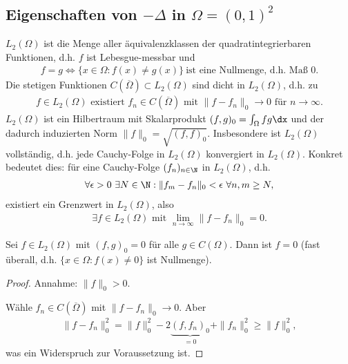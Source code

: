 \subsection{Eigenschaften von $-\Delta$ in $\Omega = (0,1)^2$}


$L_2(\Omega)$ ist die Menge aller äquivalenzklassen der quadratintegrierbaren
Funktionen, d.h. $f$ ist Lebesgue-messbar und
\begin{eqnarray*}
    f = g \Leftrightarrow \{x \in \Omega: f(x) \not = g(x)\}
    \ \text{ist eine Nullmenge, d.h. Maß 0}.
\end{eqnarray*}
Die stetigen Funktionen $C(\overline\Omega) \subset L_2(\Omega)$ sind dicht in
$L_2(\Omega)$, d.h. zu
\begin{eqnarray*}
    f \in L_2(\Omega) \text{ existiert } f_n \in C(\overline
    \Omega) \text{ mit } \|f - f_n\|_0 \to 0 \text{ für } n \to \infty.
\end{eqnarray*}
$L_2(\Omega)$ ist ein Hilbertraum mit
    Skalarprodukt $(f, g)_0 = \int_\Omega f g \dx$ und der dadurch induzierten
    Norm $\|f\|_0 = \sqrt{(f, f)_0}$.
Insbesondere ist $L_2(\Omega)$
vollständig, d.h. jede Cauchy-Folge in $L_2(\Omega)$ konvergiert in $L_2(\Omega)$. Konkret bedeutet dies: für eine Cauchy-Folge $(f_n)_{n\in\N}$ in $L_2(\Omega)$, d.h.
\begin{eqnarray*}
    \forall \epsilon > 0 \ \exists N \in \N: \|f_m - f_n\|_0 < \epsilon \
    \forall n, m \ge N,
\end{eqnarray*}
existiert ein Grenzwert in $L_2(\Omega)$, also
\begin{eqnarray*}
    \exists f \in L_2(\Omega) \text{ mit } \lim_{n \to \infty}
    \|f - f_n\|_0 = 0.
\end{eqnarray*}


\begin{Satz}
    \label{satz:2.15}
    Sei $f \in L_2(\Omega)$ mit $(f, g)_0 = 0$ für alle $g \in C(\Omega)$.
    Dann ist $f = 0$ (fast überall, d.h. $\{x \in \Omega: f(x) \not =
    0\}$ ist Nullmenge).
\end{Satz}


\begin{proof}
    Annahme: $\|f\|_0 > 0$.

    Wähle $f_n \in C(\overline \Omega)$ mit $\|f
    - f_n\|_0 \to 0$. Aber
    \begin{eqnarray*}
        \|f - f_n\|_0^2 = \|f\|_0^2 - 2 \underbrace{(f, f_n)_0}_{= 0} +
        \|f_n\|_0^2 \ge \|f\|_0^2,
    \end{eqnarray*}
    was ein Widerspruch zur Voraussetzung ist.
\end{proof}


